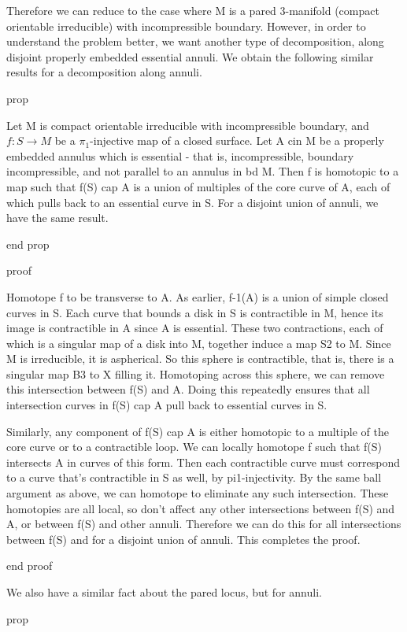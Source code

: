 Therefore we can reduce to the case where M is a pared 3-manifold (compact
orientable irreducible) with incompressible boundary. However, in order to
understand the problem better, we want another type of decomposition, along
disjoint properly embedded essential annuli. We obtain the following similar
results for a decomposition along annuli.

prop

Let M is compact orientable irreducible with incompressible boundary, and $f
\colon S \to M$ be a $\pi_1$-injective map of a closed surface. Let A cin M be
a properly embedded annulus which is essential - that is, incompressible,
boundary incompressible, and not parallel to an annulus in bd M. Then f is
homotopic to a map such that f(S) cap A is a union of multiples of the core
curve of A, each of which pulls back to an essential curve in S. For a disjoint
union of annuli, we have the same result.

end prop

proof

Homotope f to be transverse to A. As earlier, f-1(A) is a union of simple
closed curves in S. Each curve that bounds a disk in S is contractible in M,
hence its image is contractible in A since A is essential. These two
contractions, each of which is a singular map of a disk into M, together induce
a map S2 to M. Since M is irreducible, it is aspherical. So this sphere is
contractible, that is, there is a singular map B3 to X filling it. Homotoping
across this sphere, we can remove this intersection between f(S) and A. Doing
this repeatedly ensures that all intersection curves in f(S) cap A pull back to
essential curves in S.

Similarly, any component of f(S) cap A is either homotopic to a multiple of the
core curve or to a contractible loop. We can locally homotope f such that f(S)
intersects A in curves of this form. Then each contractible curve must
correspond to a curve that's contractible in S as well, by pi1-injectivity. By
the same ball argument as above, we can homotope to eliminate any such
intersection. These homotopies are all local, so don't affect any other
intersections between f(S) and A, or between f(S) and other annuli. Therefore
we can do this for all intersections between f(S) and for a disjoint union of
annuli. This completes the proof.

end proof

We also have a similar fact about the pared locus, but for annuli.

prop

